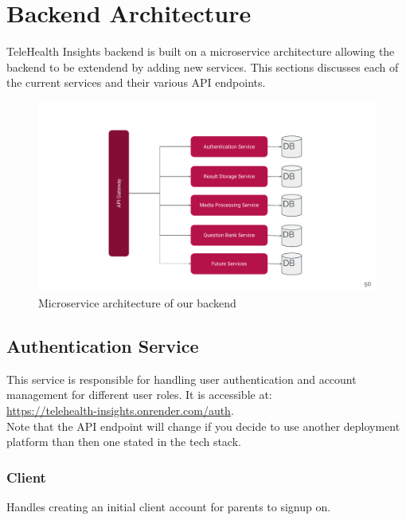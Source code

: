 \documentclass{article}
\begin{document}
\section{Backend Architecture}
    TeleHealth Insights backend is built on a microservice architecture allowing the backend to be extendend by adding new services.
    This sections discusses each of the current services and their various API endpoints.
\begin{figure}[H]
    \centering
    \includegraphics[scale=0.5]{images/Telehealth Insights Capstone Presentation.pdf}
    \caption{Microservice architecture of our backend}
  \end{figure}

  \subsection{Authentication Service}
  This service is responsible for handling user authentication and account management 
  for different user roles. It is accessible at: \\
  \url{https://telehealth-insights.onrender.com/auth}.\\ Note that the API endpoint will change if you decide to use another deployment platform than then one stated in the tech stack.
  
  \subsubsection{Client}
  Handles creating an initial client account for parents to signup on. 
  
\end{document}
